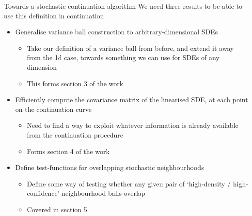 \documentclass[presentation]{beamer}
\begin{document}
\begin{frame}[label={sec:orgf16617f},plain]{Towards a stochastic continuation algorithm}
We need three results to be able to use this definition in continuation
\vfill
\begin{itemize}
\item Generalise variance ball construction to arbitrary-dimensional SDEs
\begin{itemize}
\item Take our definition of a variance ball from before, and extend it away from the 1d case, towards something we can use for SDEs of any dimension
\item This forms section 3 of the work
\end{itemize}
\end{itemize}
\vfill
\begin{itemize}
\item Efficiently compute the covariance matrix of the linearised SDE, at each point on the continuation curve
\begin{itemize}
\item Need to find a way to exploit whatever information is already available from the continuation procedure
\item Forms section 4 of the work
\end{itemize}
\end{itemize}

\vfill
\begin{itemize}
\item Define test-functions for overlapping stochastic neighbourhoods
\begin{itemize}
\item Define some way of testing whether any given pair of `high-density / high-confidence' neighbourhood balls overlap
\item Covered in section 5
\end{itemize}
\end{itemize}
\end{frame}
\end{document}
